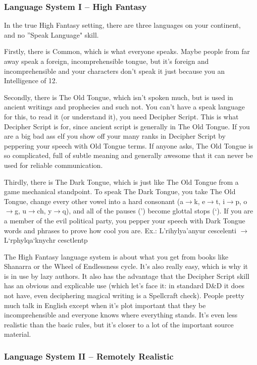 \subsubsection{Language System I -- High Fantasy}

In the true High Fantasy setting, there are three languages on your continent, and no ''Speak Language" skill.

Firstly, there is Common, which is what everyone speaks. Maybe people from far away speak a foreign, incomprehensible tongue, but it's foreign and incomprehensible and your characters don't speak it just because you an Intelligence of 12.

Secondly, there is The Old Tongue, which isn't spoken much, but is used in ancient writings and prophecies and such not. You can't have a speak language for this, to read it (or understand it), you need Decipher Script. This is what Decipher Script is for, since ancient script is generally in The Old Tongue. If you are a big bad ass elf you show off your many ranks in Decipher Script by peppering your speech with Old Tongue terms. If anyone asks, The Old Tongue is so complicated, full of subtle meaning and generally awesome that it can never be used for reliable communication.

Thirdly, there is The Dark Tongue, which is just like The Old Tongue from a game mechanical standpoint. To speak The Dark Tongue, you take The Old Tongue, change every other vowel into a hard consonant (a$\rightarrow$k, e$\rightarrow$t, i$\rightarrow$p, o$\rightarrow$g, u$\rightarrow$ch, y$\rightarrow$q), and all of the pauses (') become glottal stops (`). If you are a member of the evil political party, you pepper your speech with Dark Tongue words and phrases to prove how cool you are.
Ex.: L'rihylya'anyur cescelenti $\rightarrow$ L`rphylqa`knychr cesctlentp

The High Fantasy language system is about what you get from books like Shanarra or the Wheel of Endlessness cycle. It's also really easy, which is why it is in use by lazy authors. It also has the advantage that the Decipher Script skill has an obvious and explicable use (which let's face it: in standard D\&D it does not have, even deciphering magical writing is a Spellcraft check). People pretty much talk in English except when it's plot important that they be incomprehensible and everyone knows where everything stands. It's even less realistic than the basic rules, but it's closer to a lot of the important source material.

\subsubsection{Language System II -- Remotely Realistic}

